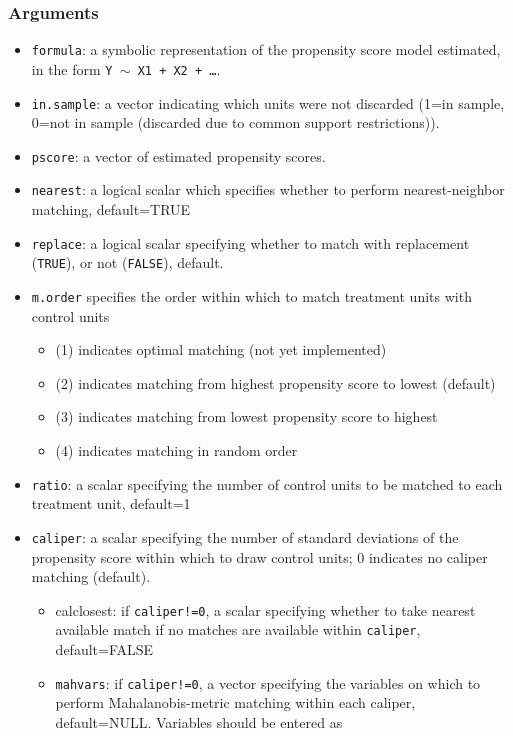 \documentclass[oneside,letterpaper,titlepage]{article}
\begin{document}
\begin{appendix}
\subsubsection{Arguments}
\begin{itemize}
\item \texttt{formula}: a symbolic representation of the propensity
  score model estimated, in the form {\tt Y $\sim$ X1 + X2 + \dots}.
\item \texttt{in.sample}: a vector indicating which units were not
  discarded (1=in sample, 0=not in sample (discarded due to common
  support restrictions)).
\item \texttt{pscore}: a vector of estimated propensity scores.
\item \texttt{nearest}: a logical scalar which specifies whether to
  perform nearest-neighbor matching, default=TRUE
\item \texttt{replace}: a logical scalar specifying whether to match
  with replacement (\texttt{TRUE}), or not (\texttt{FALSE}), default.
\item \texttt{m.order} specifies the order within which to match
  treatment units with control units
  \begin{itemize}
  \item (1) indicates optimal matching (not yet implemented)
  \item (2) indicates matching from highest propensity score to lowest
    (default)
  \item (3) indicates matching from lowest propensity score to highest
  \item (4) indicates matching in random order
  \end{itemize}
\item \texttt{ratio}: a scalar specifying the number of control units
  to be matched to each treatment unit, default=1
\item \texttt{caliper}: a scalar specifying the number of standard
  deviations of the propensity score within which to draw control
  units; 0 indicates no caliper matching (default).
  \begin{itemize}
  \item{calclosest}: if \texttt{caliper!=0}, a scalar specifying
    whether to take nearest available match if no matches are
    available within \texttt{caliper}, default=FALSE
  \item\texttt{mahvars}: if \texttt{caliper!=0}, a vector specifying
    the variables on which to perform Mahalanobis-metric matching
    within each caliper, default=NULL.  Variables should be entered as

\end{itemize}
\end{itemize}
\end{appendix}
\end{document}
